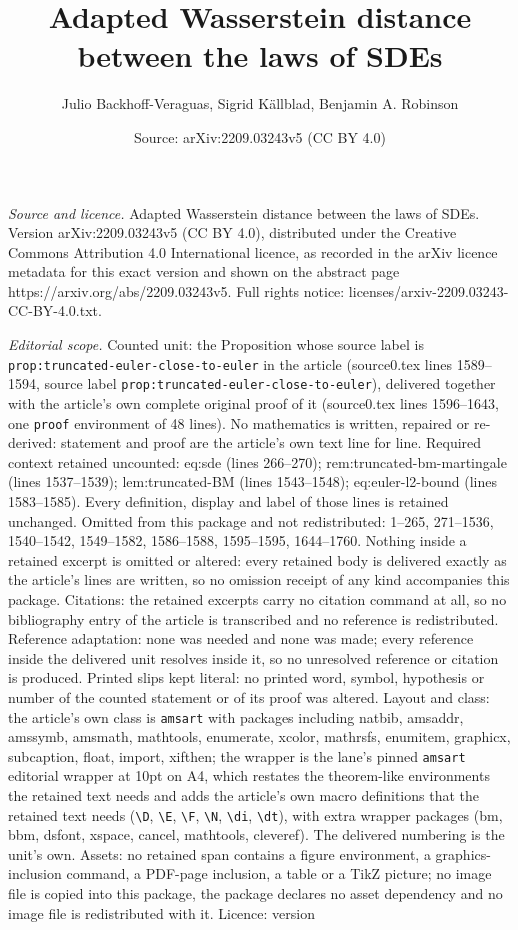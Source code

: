 \documentclass[10pt,a4paper]{amsart}
\title[Adapted Wasserstein distance between the laws of SDEs]{Adapted Wasserstein distance between the laws of SDEs}
\author{Julio Backhoff-Veraguas, Sigrid K\"allblad, Benjamin A. Robinson}
\date{Source: arXiv:2209.03243v5 (CC BY 4.0)}
\begin{document}
\maketitle

\noindent\emph{Source and licence.} Adapted Wasserstein distance between the laws of SDEs. Version arXiv:2209.03243v5 (CC BY 4.0), distributed under the Creative Commons Attribution 4.0 International licence, as recorded in the arXiv licence metadata for this exact version and shown on the abstract page https://arxiv.org/abs/2209.03243v5. Full rights notice: licenses/arxiv-2209.03243-CC-BY-4.0.txt.\par\smallskip

\noindent\textit{Editorial scope.} Counted unit: the Proposition whose source label is \texttt{prop:truncated-euler-close-to-euler} in the article (source0.tex lines 1589--1594, source label \texttt{prop:truncated-euler-close-to-euler}), delivered together with the article's own complete original proof of it (source0.tex lines 1596--1643, one \texttt{proof} environment of 48 lines). No mathematics is written, repaired or re-derived: statement and proof are the article's own text line for line. Required context retained uncounted: eq:sde (lines 266--270); rem:truncated-bm-martingale (lines 1537--1539); lem:truncated-BM (lines 1543--1548); eq:euler-l2-bound (lines 1583--1585). Every definition, display and label of those lines is retained unchanged. Omitted from this package and not redistributed: 1--265, 271--1536, 1540--1542, 1549--1582, 1586--1588, 1595--1595, 1644--1760. Nothing inside a retained excerpt is omitted or altered: every retained body is delivered exactly as the article's lines are written, so no omission receipt of any kind accompanies this package. Citations: the retained excerpts carry no citation command at all, so no bibliography entry of the article is transcribed and no reference is redistributed. Reference adaptation: none was needed and none was made; every reference inside the delivered unit resolves inside it, so no unresolved reference or citation is produced. Printed slips kept literal: no printed word, symbol, hypothesis or number of the counted statement or of its proof was altered. Layout and class: the article's own class is \texttt{amsart} with packages including natbib, amsaddr, amssymb, amsmath, mathtools, enumerate, xcolor, mathrsfs, enumitem, graphicx, subcaption, float, import, xifthen; the wrapper is the lane's pinned \texttt{amsart} editorial wrapper at 10pt on A4, which restates the theorem-like environments the retained text needs and adds the article's own macro definitions that the retained text needs (\texttt{\textbackslash D}, \texttt{\textbackslash E}, \texttt{\textbackslash F}, \texttt{\textbackslash N}, \texttt{\textbackslash di}, \texttt{\textbackslash dt}), with extra wrapper packages (bm, bbm, dsfont, xspace, cancel, mathtools, cleveref). The delivered numbering is the unit's own. Assets: no retained span contains a figure environment, a graphics-inclusion command, a PDF-page inclusion, a table or a TikZ picture; no image file is copied into this package, the package declares no asset dependency and no image file is redistributed with it. Licence: version 
\end{document}
